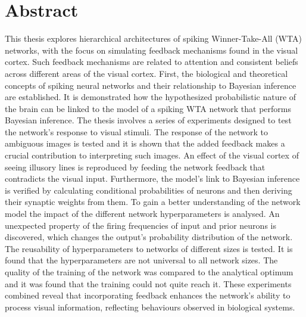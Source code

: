 
\chapter*{Abstract}
\label{cha:abstract}

This thesis explores hierarchical architectures of spiking Winner-Take-All (WTA) networks, with the focus on simulating feedback mechanisms found in the visual cortex. Such feedback mechanisms are related to attention and consistent beliefs across different areas of the visual cortex. 
First, the biological and theoretical concepts of spiking neural networks and their relationship to Bayesian inference are established. It is demonstrated how the hypothesized probabilistic nature of the brain can be linked to the model of a spiking WTA network that performs Bayesian inference.
The thesis involves a series of experiments designed to test the network's response to visual stimuli. The response of the network to ambiguous images is tested and it is shown that the added feedback makes a crucial contribution to interpreting such images. An effect of the visual cortex of seeing illusory lines is reproduced by feeding the network feedback that contradicts the visual input. Furthermore, the model's link to Bayesian inference is verified by calculating conditional probabilities of neurons and then deriving their synaptic weights from them. To gain a better understanding of the network model the impact of the different network hyperparameters is analysed. An unexpected property of the firing frequencies of input and prior neurons is discovered, which changes the output's probability distribution of the network. The reusability of hyperparameters to networks of different sizes is tested. It is found that the hyperparameters are not universal to all network sizes. The quality of the training of the network was compared to the analytical optimum and it was found that the training could not quite reach it. These experiments combined reveal that incorporating feedback enhances the network's ability to process visual information, reflecting behaviours observed in biological systems.

